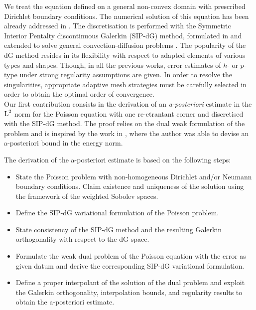 \documentclass[a4paper,11pt]{article}
\begin{document}
{We treat the equation defined on a general non-convex domain with prescribed Dirichlet boundary conditions. The numerical solution of this equation has been already addressed in \cite{CKW:2002,SH:2016,ZS:2002}. The discretisation is performed with the Symmetric Interior Pentalty discontinuous Galerkin (SIP-dG) method, formulated in \cite{AD:1982,ABCM:2000,ABCM:2002} and extended to solve general convection-diffusion problems \cite{Cockburn:1998,Cockburn:2001}. The popularity of the dG method resides in its flexibility with respect to adapted elements of various types and shapes. Though, in all the previous works, error estimates of $h$- or $p$-type under strong regularity assumptions are given. In order to resolve the singularities, appropriate adaptive mesh strategies must be carefully selected in order to obtain the optimal order of convergence.\\

Our first contribution consists in the derivation of an \textit{a-posteriori} estimate in the $\operatorname L^{2}$ norm for the Poisson equation with one re-etrantant corner and discretised with the SIP-dG method. The proof relies on the dual weak formulation of the problem and is inspired by the work in \cite{Wihler:2003,Schwab:1998}, where the author was able to devise an a-posteriori bound in the energy norm.

The derivation of the a-posteriori estimate is based on the following steps:

\begin{itemize}

\item State the Poisson problem with non-homogeneous Dirichlet and/or Neumann boundary conditions. Claim existence and uniqueness of the solution using the framework of the weighted Sobolev spaces.
\item Define the SIP-dG variational formulation of the Poisson problem.
    
\item State consistency of the SIP-dG method and the resulting Galerkin orthogonality with respect to the dG space.
    
\item Formulate the weak dual problem of the Poisson equation with the error as given datum and derive the corresponding SIP-dG variational formulation.
    
\item Define a proper interpolant of the solution of the dual problem and exploit the Galerkin orthogonality, interpolation bounds, and regularity results \cite{BG:1988} to obtain the a-posteriori estimate.   
    

\end{itemize}}
\end{document}
